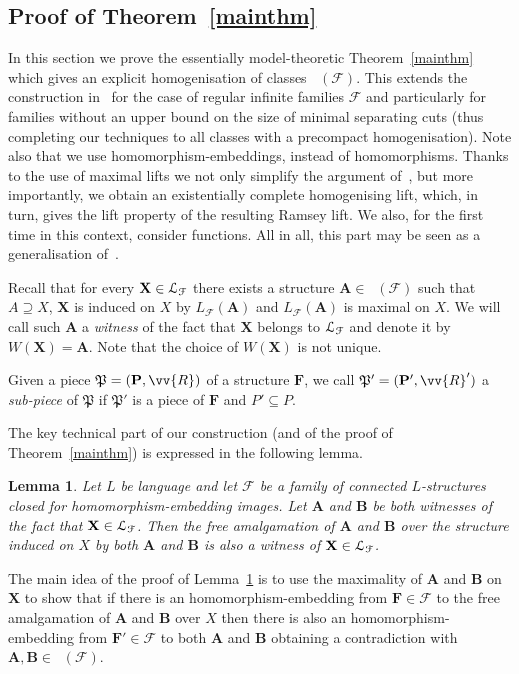 \documentclass{elsarticle}
\def\Lifts{{\cal L}}
\def\Forb{\mathop{\mathrm{Forb_{he}}}\nolimits}
\def\str#1{\mathbf {#1}}
\def\F{{\mathcal F}}
\def\Piece{{\mathfrak P}}
\theoremstyle{plain}
\newtheorem{lemma}[theorem]{Lemma}
\theoremstyle{definition}
\theoremstyle{remark}
\begin{document}
\subsection{Proof of Theorem~\ref{mainthm}}
\label{sec:homogenization}
  In this section we prove the essentially model-theoretic Theorem~\ref{mainthm}
which gives an explicit homogenisation of classes $\Forb(\F)$.
This
extends the construction in~\cite{Hubicka2013} for the case of regular infinite families $\mathcal
F$ and particularly for families without an upper bound on the size of minimal separating cuts (thus completing our
techniques to all classes with a precompact homogenisation). Note also that we use  homomorphism-embeddings, instead of homomorphisms.  Thanks to the use of maximal
lifts we not only simplify the argument of~\cite{Hubicka2013}, but
more importantly, we obtain an existentially complete homogenising lift, which, in
turn, gives the lift property of the resulting Ramsey lift. We also, for the first time in this context, consider functions. 
All in all, this part may be seen as a generalisation of~\cite{Hubicka2009, Hubicka2013, Hartman2014}.


Recall that for every $\str{X}\in \Lifts_\mathcal F$ there exists a structure $\str{A}\in\Forb(\F)$ such that $A\supseteq X$, $\str{X}$ is induced on $X$ by $L_\F(\str{A})$
and $L_\F(\str{A})$ is maximal on $X$. We will call such $\str A$ a \emph{witness} of the fact that $\str{X}$ belongs to $\Lifts_\mathcal F$ and denote it by $W(\str{X})=\str A$. Note that the choice of $W(\str{X})$ is not unique.

Given a piece $\Piece=(\str{P},\vv{R})$ of a structure
$\str{F}$, we call $\Piece'=(\str{P}',\vv{R}')$ a {\em
sub-piece} of $\Piece$ if $\Piece'$ is a piece of $\str{F}$ and $P'\subseteq P$.

The key technical part of our construction (and of the proof of Theorem~\ref{mainthm}) is expressed in the following lemma.

\begin{lemma}
\label{lem:amalgamationstr}
Let $L$ be language and let $\mathcal F$ be a family of connected $L$-structures closed for homo{\-}morphism-embedding images.
Let $\str{A}$ and $\str{B}$ be both witnesses of the fact that $\str{X}\in\Lifts_\F$. Then the free amalgamation of $\str{A}$ and $\str{B}$ over the structure induced on $X$ by both $\str{A}$ and $\str{B}$ is also a witness of $\str{X}\in\Lifts_\F$.
\end{lemma}
The main idea of the proof of Lemma~\ref{lem:amalgamationstr} is to use the maximality of $\str{A}$ and $\str{B}$ on $\str{X}$ to show that if
there is an homomorphism-embedding from $\str{F}\in \mathcal F$ to the free amalgamation of $\str{A}$ and $\str{B}$ over $X$ then there is also
an homomorphism-embedding from $\str{F}'\in \mathcal F$ to both $\str{A}$ and $\str{B}$ obtaining a contradiction with $\str{A},\str{B}\in \Forb(\mathcal F)$. 
\end{document}
